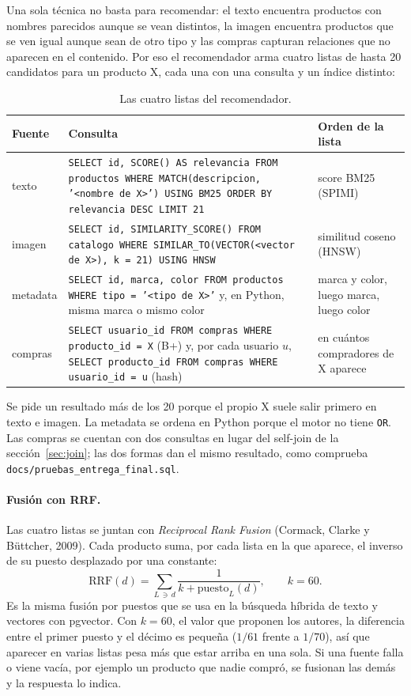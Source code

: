 \documentclass[11pt,a4paper]{article}
\begin{document}
Una sola técnica no basta para recomendar: el texto encuentra productos con nombres parecidos aunque se vean distintos, la imagen encuentra productos que se ven igual aunque sean de otro tipo y las compras capturan relaciones que no aparecen en el contenido. Por eso el recomendador arma cuatro listas de hasta 20 candidatos para un producto X, cada una con una consulta y un índice distinto:

\begin{table}[H]
\centering
\small
\begin{tabular}{>{\raggedright\arraybackslash}p{1.5cm}>{\raggedright\arraybackslash}p{9.4cm}>{\raggedright\arraybackslash}p{3.4cm}}
\toprule
Fuente & Consulta & Orden de la lista \\
\midrule
texto & \texttt{SELECT id, SCORE() AS relevancia FROM productos WHERE MATCH(descripcion, '<nombre de X>') USING BM25 ORDER BY relevancia DESC LIMIT 21} & score BM25 (SPIMI) \\
imagen & \texttt{SELECT id, SIMILARITY\_SCORE() FROM catalogo WHERE SIMILAR\_TO(VECTOR(<vector de X>), k = 21) USING HNSW} & similitud coseno (HNSW) \\
metadata & \texttt{SELECT id, marca, color FROM productos WHERE tipo = '<tipo de X>'} y, en Python, misma marca o mismo color & marca y color, luego marca, luego color \\
compras & \texttt{SELECT usuario\_id FROM compras WHERE producto\_id = X} (B+) y, por cada usuario $u$, \texttt{SELECT producto\_id FROM compras WHERE usuario\_id = u} (hash) & en cuántos compradores de X aparece \\
\bottomrule
\end{tabular}
\caption{Las cuatro listas del recomendador.}
\end{table}

Se pide un resultado más de los 20 porque el propio X suele salir primero en texto e imagen. La metadata se ordena en Python porque el motor no tiene \texttt{OR}. Las compras se cuentan con dos consultas en lugar del self-join de la sección~\ref{sec:join}; las dos formas dan el mismo resultado, como comprueba \texttt{docs/pruebas\_entrega\_final.sql}.

\paragraph{Fusión con RRF.} Las cuatro listas se juntan con \emph{Reciprocal Rank Fusion} (Cormack, Clarke y Büttcher, 2009). Cada producto suma, por cada lista en la que aparece, el inverso de su puesto desplazado por una constante:
\[
  \text{RRF}(d) = \sum_{L \,\ni\, d} \frac{1}{k + \text{puesto}_L(d)}, \qquad k = 60.
\]
Es la misma fusión por puestos que se usa en la búsqueda híbrida de texto y vectores con pgvector. Con $k = 60$, el valor que proponen los autores, la diferencia entre el primer puesto y el décimo es pequeña ($1/61$ frente a $1/70$), así que aparecer en varias listas pesa más que estar arriba en una sola. Si una fuente falla o viene vacía, por ejemplo un producto que nadie compró, se fusionan las demás y la respuesta lo indica.
\end{document}
